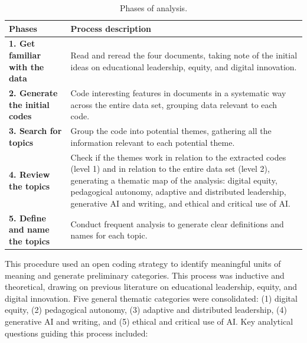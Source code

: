 \documentclass[english]{textolivre}
\begin{document}
\begin{table}[htbp]
\centering
\begin{threeparttable}
\caption{Phases of analysis.}
\label{tab1}

\begin{tabularx}{\textwidth}{>{\raggedright\arraybackslash}p{}X}
\toprule
\textbf{Phases} & \textbf{Process description} \\
\midrule

\textbf{1. Get familiar with the data} &
Read and reread the four documents, taking note of the initial ideas on educational leadership, equity, and digital innovation. \\

\addlinespace

\textbf{2. Generate the initial codes} &
Code interesting features in documents in a systematic way across the entire data set, grouping data relevant to each code. \\

\addlinespace

\textbf{3. Search for topics} &
Group the code into potential themes, gathering all the information relevant to each potential theme. \\

\addlinespace

\textbf{4. Review the topics} &
Check if the themes work in relation to the extracted codes (level 1) and in relation to the entire data set (level 2), generating a thematic map of the analysis: digital equity, pedagogical autonomy, adaptive and distributed leadership, generative AI and writing, and ethical and critical use of AI. \\

\addlinespace

\textbf{5. Define and name the topics} &
Conduct frequent analysis to generate clear definitions and names for each topic. \\

\bottomrule
\end{tabularx}
\end{threeparttable}
\end{table}

This procedure used an open coding strategy to identify meaningful units of meaning and generate preliminary categories. This process was inductive and theoretical, drawing on previous literature on educational leadership, equity, and digital innovation. Five general thematic categories were consolidated: (1) digital equity, (2) pedagogical autonomy, (3) adaptive and distributed leadership, (4) generative AI and writing, and (5) ethical and critical use of AI. Key analytical questions guiding this process included:
\end{document}
